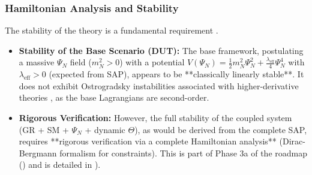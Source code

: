 \documentclass[11pt, a4paper]{article}
\theoremstyle{remark}
\begin{document}
\subsubsection{Hamiltonian Analysis and Stability}
\label{sec:analisis_estabilidad_final}
The stability of the theory is a fundamental requirement \citep{HenneauxTeitelboim1992}.
\begin{itemize}
    \item \textbf{Stability of the Base Scenario (DUT):} The base framework, postulating a massive \( \Psi_N \) field (\( m_N^2 > 0 \)) with a potential \( V(\Psi_N) = \frac{1}{2}m_N^2 \Psi_N^2 + \frac{\lambda_{\text{eff}}}{4}\Psi_N^4 \) with \( \lambda_{\text{eff}} > 0 \) (expected from SAP), appears to be **classically linearly stable**. It does not exhibit Ostrogradsky instabilities associated with higher-derivative theories \citep{OstrogradskiRef, Woodard:2014wia}, as the base Lagrangians are second-order.
    \item \textbf{Rigorous Verification:} However, the full stability of the coupled system (GR + SM + \( \Psi_N \) + dynamic \( \Theta \)), as would be derived from the complete SAP, requires **rigorous verification via a complete Hamiltonian analysis** (Dirac-Bergmann formalism for constraints). This is part of Phase 3a of the roadmap () and is detailed in ).
\end{itemize}
\end{document}
